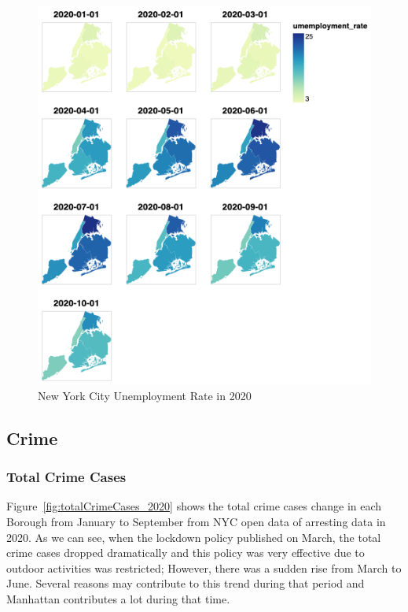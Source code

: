 \documentclass[conference]{IEEEtran}
\begin{document}
\begin{figure}[ht!]
    \centering
    \includegraphics[width=\linewidth]{images/unemployment_boroughs_2020.png}
    \caption{New York City Unemployment Rate in 2020}
    \label{fig:unemployment_2020}
\end{figure}

\subsection{Crime}

\subsubsection{Total Crime Cases}
Figure~\ref{fig:totalCrimeCases_2020} shows the total crime cases change in each Borough from January to September from NYC open data of arresting data in 2020. As we can see, when the lockdown policy published on March, the total crime cases dropped dramatically and this policy was very effective due to outdoor activities was restricted; However, there was a sudden rise from March to June. Several reasons may contribute to this trend during that period and Manhattan contributes a lot during that time.
\end{document}
